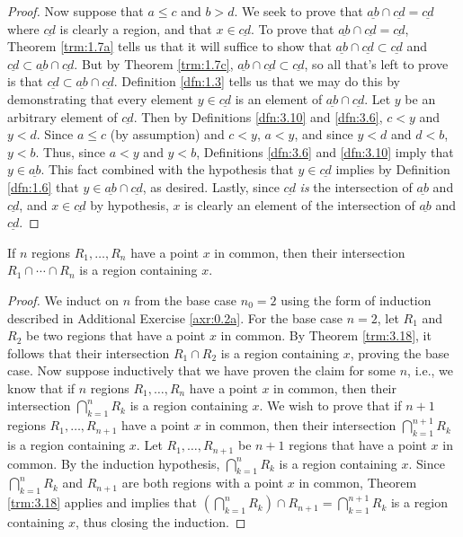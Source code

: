 \documentclass[../main.tex]{subfiles}
\begin{document}
\begin{theorem}
\begin{proof}
        Now suppose that $a\leq c$ and $b>d$. We seek to prove that $\underline{ab}\cap\underline{cd}=\underline{cd}$ where $\underline{cd}$ is clearly a region, and that $x\in\underline{cd}$. To prove that $\underline{ab}\cap\underline{cd}=\underline{cd}$, Theorem \ref{trm:1.7a} tells us that it will suffice to show that $\underline{ab}\cap\underline{cd}\subset\underline{cd}$ and $\underline{cd}\subset\underline{ab}\cap\underline{cd}$. But by Theorem \ref{trm:1.7c}, $\underline{ab}\cap\underline{cd}\subset\underline{cd}$, so all that's left to prove is that $\underline{cd}\subset\underline{ab}\cap\underline{cd}$. Definition \ref{dfn:1.3} tells us that we may do this by demonstrating that every element $y\in\underline{cd}$ is an element of $\underline{ab}\cap\underline{cd}$. Let $y$ be an arbitrary element of $\underline{cd}$. Then by Definitions \ref{dfn:3.10} and \ref{dfn:3.6}, $c<y$ and $y<d$. Since $a\leq c$ (by assumption) and $c<y$, $a<y$, and since $y<d$ and $d<b$, $y<b$. Thus, since $a<y$ and $y<b$, Definitions \ref{dfn:3.6} and \ref{dfn:3.10} imply that $y\in\underline{ab}$. This fact combined with the hypothesis that $y\in\underline{cd}$ implies by Definition \ref{dfn:1.6} that $y\in\underline{ab}\cap\underline{cd}$, as desired. Lastly, since $\underline{cd}$ \emph{is} the intersection of $\underline{ab}$ and $\underline{cd}$, and $x\in\underline{cd}$ by hypothesis, $x$ is clearly an element of the intersection of $\underline{ab}$ and $\underline{cd}$.
    \end{proof}
\end{theorem}

\begin{corollary}\label{cly:3.19}
    If $n$ regions $R_1,\dots,R_n$ have a point $x$ in common, then their intersection $R_1\cap\cdots\cap R_n$ is a region containing $x$.
    \begin{proof}
        We induct on $n$ from the base case $n_0=2$ using the form of induction described in Additional Exercise \ref{axr:0.2a}. For the base case $n=2$, let $R_1$ and $R_2$ be two regions that have a point $x$ in common. By Theorem \ref{trm:3.18}, it follows that their intersection $R_1\cap R_2$ is a region containing $x$, proving the base case. Now suppose inductively that we have proven the claim for some $n$, i.e., we know that if $n$ regions $R_1,\dots,R_n$ have a point $x$ in common, then their intersection $\bigcap_{k=1}^nR_k$ is a region containing $x$. We wish to prove that if $n+1$ regions $R_1,\dots,R_{n+1}$ have a point $x$ in common, then their intersection $\bigcap_{k=1}^{n+1}R_k$ is a region containing $x$. Let $R_1,\dots,R_{n+1}$ be $n+1$ regions that have a point $x$ in common. By the induction hypothesis, $\bigcap_{k=1}^nR_k$ is a region containing $x$. Since $\bigcap_{k=1}^nR_k$ and $R_{n+1}$ are both regions with a point $x$ in common, Theorem \ref{trm:3.18} applies and implies that $\left( \bigcap_{k=1}^nR_k \right)\cap R_{n+1}=\bigcap_{k=1}^{n+1}R_k$ is a region containing $x$, thus closing the induction.
    \end{proof}
\end{corollary}
\end{document}
